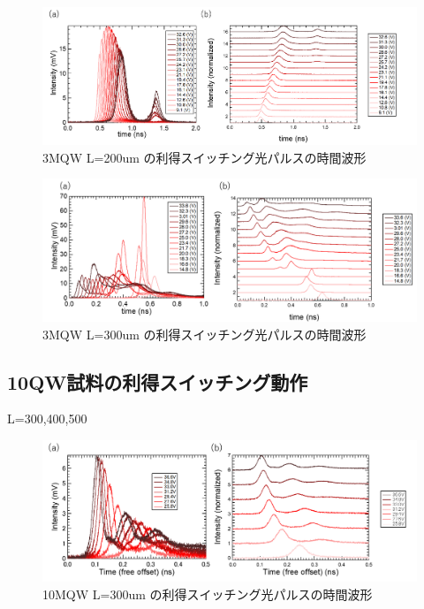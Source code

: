 {\begin{figure}[h]
	\centering
	\includegraphics[width=15cm]{figure/fig_3_2_3QW_ridge_L200_GS.png}
		\caption{3MQW L=200um の利得スイッチング光パルスの時間波形}
		\label{fig:fig_3_2_3QW_ridge_L200_GS}
\end{figure}
\begin{figure}[h]
	\centering
	\includegraphics[width=15cm]{figure/fig_3_2_3QW_ridge_L300_GS.png}
		\caption{3MQW L=300um の利得スイッチング光パルスの時間波形}
		\label{fig:fig_3_2_3QW_ridge_L300_GS}
\end{figure}
\newpage
\clearpage
\subsection{10QW試料の利得スイッチング動作}%
L=300,400,500
\begin{figure}[h]
	\centering
	\includegraphics[width=15cm]{figure/fig_3_2_10QW_ridge_L300_GS.png}
		\caption{10MQW L=300um の利得スイッチング光パルスの時間波形}
		\label{fig:fig_3_2_10QW_ridge_L300_GS}
\end{figure}

}
